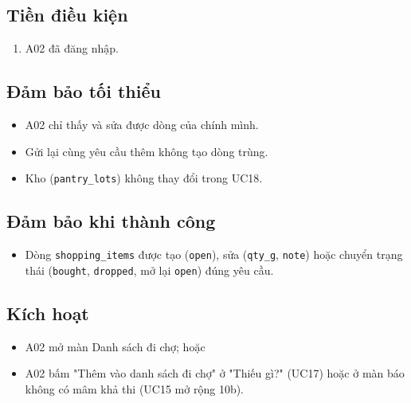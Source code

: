 \subsection{Tiền điều kiện}
\begin{enumerate}
\item A02 đã đăng nhập.
\end{enumerate}
\subsection{Đảm bảo tối thiểu}
\begin{itemize}
\item A02 chỉ thấy và sửa được dòng của chính mình.
\item Gửi lại cùng yêu cầu thêm không tạo dòng trùng.
\item Kho ({\small\texttt{pantry\_\allowbreak{}\allowbreak{}lots}}) không thay đổi trong UC18.
\end{itemize}
\subsection{Đảm bảo khi thành công}
\begin{itemize}
\item Dòng {\small\texttt{shopping\_\allowbreak{}\allowbreak{}items}} được tạo ({\small\texttt{open}}), sửa ({\small\texttt{qty\_\allowbreak{}\allowbreak{}g}}, {\small\texttt{note}}) hoặc chuyển trạng thái ({\small\texttt{bought}}, {\small\texttt{dropped}}, mở lại {\small\texttt{open}}) đúng yêu cầu.
\end{itemize}
\subsection{Kích hoạt}
\begin{itemize}
\item A02 mở màn Danh sách đi chợ; hoặc
\item A02 bấm "Thêm vào danh sách đi chợ" ở "Thiếu gì?" (UC17) hoặc ở màn báo không có mâm khả thi (UC15 mở rộng 10b).
\end{itemize}
